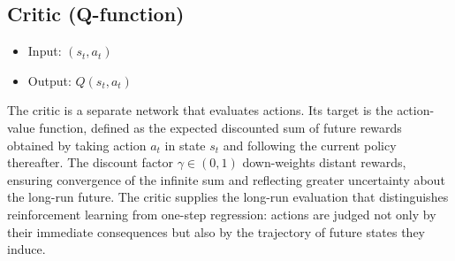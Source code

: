 \documentclass[11pt]{article}
\begin{document}
\subsection{Critic (Q-function)}
\begin{itemize}
    \item Input: $(s_t, a_t)$
    \item Output: $Q(s_t, a_t)$
\end{itemize}
The critic is a separate network that evaluates actions. Its target is the action-value function, defined as the expected discounted sum of future rewards obtained by taking action $a_t$ in state $s_t$ and following the current policy thereafter. The discount factor $\gamma \in (0,1)$ down-weights distant rewards, ensuring convergence of the infinite sum and reflecting greater uncertainty about the long-run future. The critic supplies the long-run evaluation that distinguishes reinforcement learning from one-step regression: actions are judged not only by their immediate consequences but also by the trajectory of future states they induce.
\end{document}
